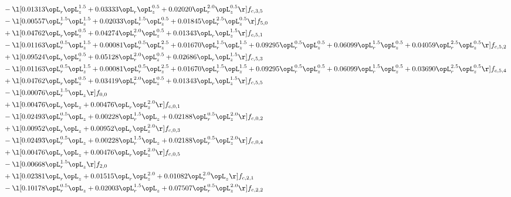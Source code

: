 \begin{alignat}{2}
& - \l[  0.01313 \opL_r \opL_z^{1.5} +  0.03333 \opL_r \opL_z^{0.5} +  0.02020 \opL_r^{2.0} \opL_z^{0.5}  \r] f_{c,3,5} \nonumber \\ 
& - \l[  0.00557 \opL_r^{1.5} \opL_z^{1.5} +  0.02033 \opL_r^{1.5} \opL_z^{0.5} +  0.01845 \opL_r^{2.5} \opL_z^{0.5}  \r] f_{5,0} \nonumber \\ 
& + \l[  0.04762 \opL_r \opL_z^{0.5} +  0.04274 \opL_r^{2.0} \opL_z^{0.5} +  0.01343 \opL_r \opL_z^{1.5}  \r] f_{c,5,1} \nonumber \\ 
& - \l[  0.01163 \opL_r^{0.5} \opL_z^{1.5} +  0.00081 \opL_r^{0.5} \opL_z^{2.5} +  0.01670 \opL_r^{1.5} \opL_z^{1.5} +  0.09295 \opL_r^{0.5} \opL_z^{0.5} +  0.06099 \opL_r^{1.5} \opL_z^{0.5} +  0.04059 \opL_r^{2.5} \opL_z^{0.5}  \r] f_{c,5,2} \nonumber \\ 
& + \l[  0.09524 \opL_r \opL_z^{0.5} +  0.05128 \opL_r^{2.0} \opL_z^{0.5} +  0.02686 \opL_r \opL_z^{1.5}  \r] f_{c,5,3} \nonumber \\ 
& - \l[  0.01163 \opL_r^{0.5} \opL_z^{1.5} +  0.00081 \opL_r^{0.5} \opL_z^{2.5} +  0.01670 \opL_r^{1.5} \opL_z^{1.5} +  0.09295 \opL_r^{0.5} \opL_z^{0.5} +  0.06099 \opL_r^{1.5} \opL_z^{0.5} +  0.03690 \opL_r^{2.5} \opL_z^{0.5}  \r] f_{c,5,4} \nonumber \\ 
& + \l[  0.04762 \opL_r \opL_z^{0.5} +  0.03419 \opL_r^{2.0} \opL_z^{0.5} +  0.01343 \opL_r \opL_z^{1.5}  \r] f_{c,5,5} \nonumber \\ 
& - \l[  0.00076 \opL_r^{1.5} \opL_z  \r] f_{0,0} \nonumber \\ 
& + \l[  0.00476 \opL_r \opL_z +  0.00476 \opL_r \opL_z^{2.0}  \r] f_{c,0,1} \nonumber \\ 
& - \l[  0.02493 \opL_r^{0.5} \opL_z +  0.00228 \opL_r^{1.5} \opL_z +  0.02188 \opL_r^{0.5} \opL_z^{2.0}  \r] f_{c,0,2} \nonumber \\ 
& + \l[  0.00952 \opL_r \opL_z +  0.00952 \opL_r \opL_z^{2.0}  \r] f_{c,0,3} \nonumber \\ 
& - \l[  0.02493 \opL_r^{0.5} \opL_z +  0.00228 \opL_r^{1.5} \opL_z +  0.02188 \opL_r^{0.5} \opL_z^{2.0}  \r] f_{c,0,4} \nonumber \\ 
& + \l[  0.00476 \opL_r \opL_z +  0.00476 \opL_r \opL_z^{2.0}  \r] f_{c,0,5} \nonumber \\ 
& - \l[  0.00668 \opL_r^{1.5} \opL_z  \r] f_{2,0} \nonumber \\ 
& + \l[  0.02381 \opL_r \opL_z +  0.01515 \opL_r \opL_z^{2.0} +  0.01082 \opL_r^{2.0} \opL_z  \r] f_{c,2,1} \nonumber \\ 
& - \l[  0.10178 \opL_r^{0.5} \opL_z +  0.02003 \opL_r^{1.5} \opL_z +  0.07507 \opL_r^{0.5} \opL_z^{2.0}  \r] f_{c,2,2} \nonumber \\ 

\end{alignat}
